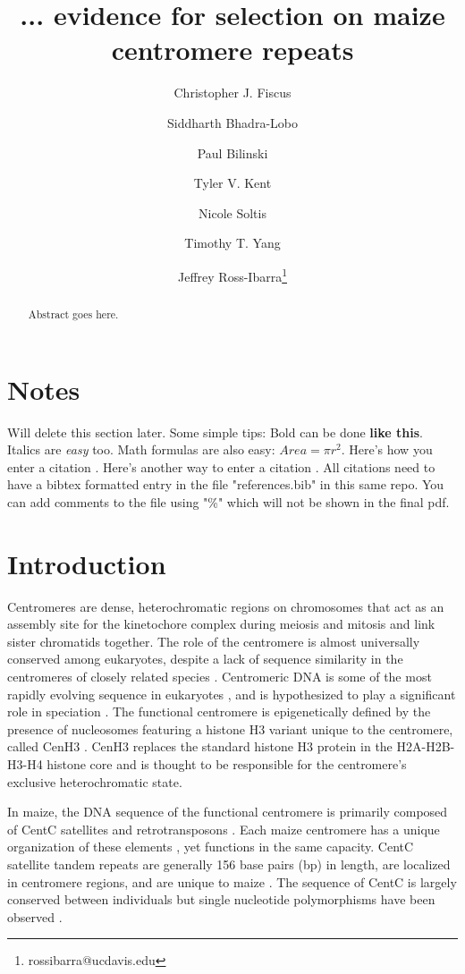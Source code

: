 \documentclass[12pt]{article}
\title{... evidence for selection on maize centromere repeats}
\author[1]{Christopher J. Fiscus}
\author[1]{Siddharth Bhadra-Lobo}
\author[1]{Paul Bilinski}
\author[1]{Tyler V. Kent}
\author[1]{Nicole Soltis}
\author[1]{Timothy T. Yang}
\author[1,2]{Jeffrey Ross-Ibarra\thanks{rossibarra@ucdavis.edu}}
\affil[1]{Department of Plant Sciences, University of California Davis}
\affil[2]{Center for Population Biology and Genome Center, University of California Davis}
\date{}
\begin{document}
\maketitle

\begin{abstract}
Abstract goes here.
\end{abstract}

\begin{footnotesize}
\end{footnotesize}

\section*{Notes}

Will delete this section later.  Some simple tips:
Bold can be done {\bf like this}.  Italics are \emph{easy} too.  Math formulas are also easy: $Area=\pi r^2$.
Here's how you enter a citation \cite{Wolfgruber2009}.
Here's another way to enter a citation \citep{Wolfgruber2009}.
All citations need to have a bibtex formatted entry in the file "references.bib" in this same repo. You can add comments to the file using "\%" which will not be shown in the final pdf.  

\section{Introduction}

Centromeres are dense, heterochromatic regions on chromosomes that act as an assembly site for the kinetochore complex during meiosis and mitosis and link sister chromatids together.  The role of the centromere is almost universally conserved among eukaryotes, despite a lack of sequence similarity in the centromeres of closely related species \cite{Henikoff2001}.  Centromeric DNA is some of the most rapidly evolving sequence in eukaryotes \cite{Csink1998}, \cite{Henikoff2001} and is hypothesized to play a significant role in speciation \cite{Henikoff2001}.  The functional centromere is epigenetically defined by the presence of nucleosomes featuring a histone H3 variant unique to the centromere, called CenH3 \cite{Henikoff2001}.  CenH3 replaces the standard histone H3 protein in the H2A-H2B-H3-H4 histone core and is thought to be responsible for the centromere's exclusive heterochromatic state. %

In maize, the DNA sequence of the functional centromere is primarily composed of CentC satellites and retrotransposons \cite{Nagaki2003}.  Each maize centromere has a unique organization of these elements \cite{Ananiev1998}, yet functions in the same capacity.  CentC satellite tandem repeats are generally 156 base pairs (bp) in length, are localized in centromere regions, and are unique to maize \cite{Ananiev1998}.  The sequence of CentC is largely conserved between individuals but single nucleotide polymorphisms have been observed \cite{Ananiev1998}.  
\end{document}
